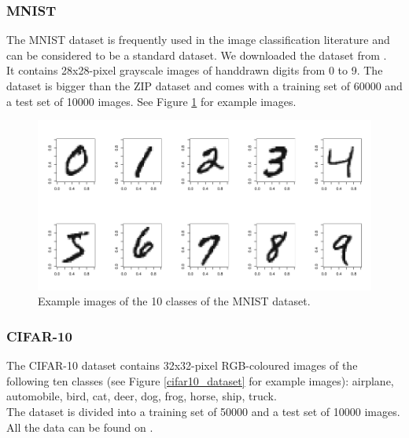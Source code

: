 \subsubsection{MNIST}

The MNIST dataset is frequently used in the image classification literature
and can be considered to be a standard dataset.
We downloaded the dataset from \cite{mnist}.\\
It contains 28x28-pixel grayscale images of handdrawn digits from 0 to 9.
The dataset is bigger than the ZIP dataset and comes with a training set of 60000 and a test set of 10000 images.
See Figure \ref{mnist_dataset} for example images.

\begin{figure}
 \includegraphics[width=\textwidth]{../plots/mnist_dataset}
 \caption{Example images of the 10 classes of the MNIST dataset.}
 \label{mnist_dataset}
\end{figure}


\subsubsection{CIFAR-10}

The CIFAR-10 dataset contains 32x32-pixel RGB-coloured images of the following ten classes
(see Figure \ref{cifar10_dataset} for example images):
airplane,
automobile,
bird,
cat,
deer,
dog,
frog,
horse,
ship,
truck.\\

The dataset is divided into a training set of 50000 and a test set of 10000 images.\\
All the data can be found on \cite{cifar10}.

